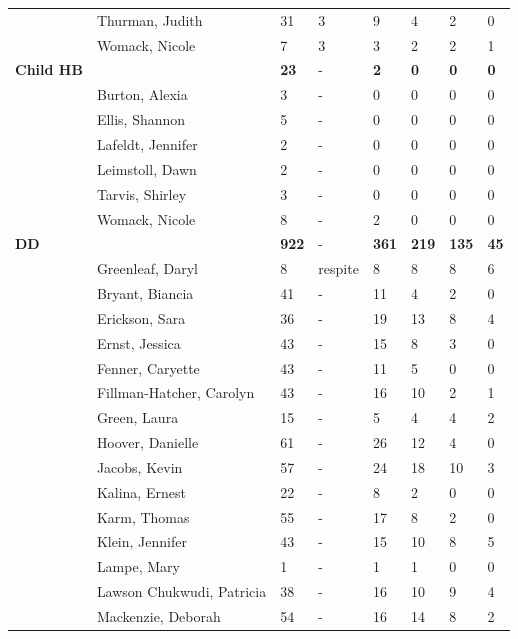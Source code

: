 \documentclass{article}\usepackage[]{graphicx}\usepackage[]{color}
\begin{document}
{\begin{longtable} { >{\raggedright}p{}p{}p{}p{}p{}p{}p{}p{}}
   & Thurman, Judith & 31 & 3 & 9 & 4 & 2 & 0 \\ 
   & Womack, Nicole & 7 & 3 & 3 & 2 & 2 & 1 \\ 
   \hline
\textbf{Child HB} &  & \textbf{23} & - & \textbf{2} & \textbf{0} & \textbf{0} & \textbf{0} \\ 
   \rowcolor[gray]{0.90} & Burton, Alexia & 3 & - & 0 & 0 & 0 & 0 \\ 
   \rowcolor[gray]{0.90} & Ellis, Shannon & 5 & - & 0 & 0 & 0 & 0 \\ 
   & Lafeldt, Jennifer & 2 & - & 0 & 0 & 0 & 0 \\ 
   & Leimstoll, Dawn & 2 & - & 0 & 0 & 0 & 0 \\ 
   & Tarvis, Shirley & 3 & - & 0 & 0 & 0 & 0 \\ 
   \rowcolor[gray]{0.90} & Womack, Nicole & 8 & - & 2 & 0 & 0 & 0 \\ 
   \hline
\textbf{DD} &  & \textbf{922} & - & \textbf{361} & \textbf{219} & \textbf{135} & \textbf{45} \\ 
   \rowcolor[gray]{0.90} & Greenleaf, Daryl & 8 & respite & 8 & 8 & 8 & 6 \\ 
   & Bryant, Biancia & 41 & - & 11 & 4 & 2 & 0 \\ 
   & Erickson, Sara & 36 & - & 19 & 13 & 8 & 4 \\ 
   & Ernst, Jessica & 43 & - & 15 & 8 & 3 & 0 \\ 
   \rowcolor[gray]{0.90} & Fenner, Caryette & 43 & - & 11 & 5 & 0 & 0 \\ 
   \rowcolor[gray]{0.90} & Fillman-Hatcher, Carolyn & 43 & - & 16 & 10 & 2 & 1 \\ 
   \rowcolor[gray]{0.90} & Green, Laura & 15 & - & 5 & 4 & 4 & 2 \\ 
   & Hoover, Danielle & 61 & - & 26 & 12 & 4 & 0 \\ 
   & Jacobs, Kevin & 57 & - & 24 & 18 & 10 & 3 \\ 
   & Kalina, Ernest & 22 & - & 8 & 2 & 0 & 0 \\ 
   \rowcolor[gray]{0.90} & Karm, Thomas & 55 & - & 17 & 8 & 2 & 0 \\ 
   \rowcolor[gray]{0.90} & Klein, Jennifer & 43 & - & 15 & 10 & 8 & 5 \\ 
   \rowcolor[gray]{0.90} & Lampe, Mary & 1 & - & 1 & 1 & 0 & 0 \\ 
   & Lawson Chukwudi, Patricia & 38 & - & 16 & 10 & 9 & 4 \\ 
   & Mackenzie, Deborah & 54 & - & 16 & 14 & 8 & 2 \\ 

\end{longtable}}
\end{document}
